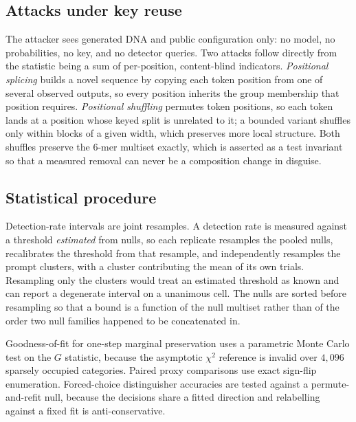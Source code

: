 \subsection{Attacks under key reuse}

The attacker sees generated DNA and public configuration only: no model, no probabilities, no key, and
no detector queries. Two attacks follow directly from the statistic being a sum of per-position,
content-blind indicators. \emph{Positional splicing} builds a novel sequence by copying each token
position from one of several observed outputs, so every position inherits the group membership that
position requires. \emph{Positional shuffling} permutes token positions, so each token lands at a
position whose keyed split is unrelated to it; a bounded variant shuffles only within blocks of a given
width, which preserves more local structure. Both shuffles preserve the 6-mer multiset exactly, which
is asserted as a test invariant so that a measured removal can never be a composition change in
disguise.

\subsection{Statistical procedure}

Detection-rate intervals are joint resamples. A detection rate is measured against a threshold
\emph{estimated} from nulls, so each replicate resamples the pooled nulls, recalibrates the threshold
from that resample, and independently resamples the prompt clusters, with a cluster contributing the
mean of its own trials. Resampling only the clusters would treat an estimated threshold as known and
can report a degenerate interval on a unanimous cell. The nulls are sorted before resampling so that a
bound is a function of the null multiset rather than of the order two null families happened to be
concatenated in.

Goodness-of-fit for one-step marginal preservation uses a parametric Monte Carlo test on the $G$
statistic, because the asymptotic $\chi^2$ reference is invalid over $4{,}096$ sparsely occupied
categories. Paired proxy comparisons use exact sign-flip enumeration. Forced-choice distinguisher
accuracies are tested against a permute-and-refit null, because the decisions share a fitted direction
and relabelling against a fixed fit is anti-conservative.
